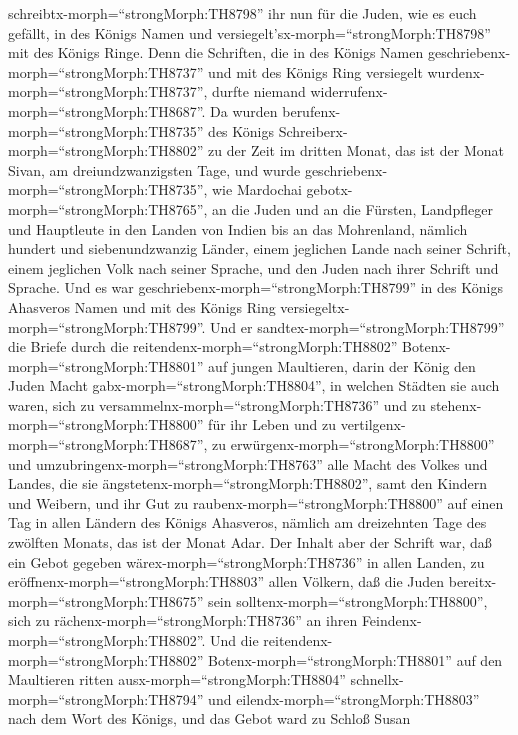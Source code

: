 schreibtx-morph=``strongMorph:TH8798'' ihr nun für die Juden, wie es
euch gefällt, in des Königs Namen und
versiegelt'sx-morph=``strongMorph:TH8798'' mit des Königs Ringe. Denn
die Schriften, die in des Königs Namen
geschriebenx-morph=``strongMorph:TH8737'' und mit des Königs Ring
versiegelt wurdenx-morph=``strongMorph:TH8737'', durfte niemand
widerrufenx-morph=``strongMorph:TH8687''.  Da wurden
berufenx-morph=``strongMorph:TH8735'' des Königs
Schreiberx-morph=``strongMorph:TH8802'' zu der Zeit im dritten Monat,
das ist der Monat Sivan, am dreiundzwanzigsten Tage, und wurde
geschriebenx-morph=``strongMorph:TH8735'', wie Mardochai
gebotx-morph=``strongMorph:TH8765'', an die Juden und an die Fürsten,
Landpfleger und Hauptleute in den Landen von Indien bis an das
Mohrenland, nämlich hundert und siebenundzwanzig Länder, einem jeglichen
Lande nach seiner Schrift, einem jeglichen Volk nach seiner Sprache, und
den Juden nach ihrer Schrift und Sprache.  Und es war
geschriebenx-morph=``strongMorph:TH8799'' in des Königs Ahasveros Namen
und mit des Königs Ring versiegeltx-morph=``strongMorph:TH8799''. Und er
sandtex-morph=``strongMorph:TH8799'' die Briefe durch die
reitendenx-morph=``strongMorph:TH8802''
Botenx-morph=``strongMorph:TH8801'' auf jungen Maultieren, 
darin der König den Juden Macht gabx-morph=``strongMorph:TH8804'', in
welchen Städten sie auch waren, sich zu
versammelnx-morph=``strongMorph:TH8736'' und zu
stehenx-morph=``strongMorph:TH8800'' für ihr Leben und zu
vertilgenx-morph=``strongMorph:TH8687'', zu
erwürgenx-morph=``strongMorph:TH8800'' und
umzubringenx-morph=``strongMorph:TH8763'' alle Macht des Volkes und
Landes, die sie ängstetenx-morph=``strongMorph:TH8802'', samt den
Kindern und Weibern, und ihr Gut zu raubenx-morph=``strongMorph:TH8800''
 auf einen Tag in allen Ländern des Königs Ahasveros,
nämlich am dreizehnten Tage des zwölften Monats, das ist der Monat Adar.
 Der Inhalt aber der Schrift war, daß ein Gebot gegeben
wärex-morph=``strongMorph:TH8736'' in allen Landen, zu
eröffnenx-morph=``strongMorph:TH8803'' allen Völkern, daß die Juden
bereitx-morph=``strongMorph:TH8675'' sein
solltenx-morph=``strongMorph:TH8800'', sich zu
rächenx-morph=``strongMorph:TH8736'' an ihren
Feindenx-morph=``strongMorph:TH8802''.  Und die
reitendenx-morph=``strongMorph:TH8802''
Botenx-morph=``strongMorph:TH8801'' auf den Maultieren ritten
ausx-morph=``strongMorph:TH8804'' schnellx-morph=``strongMorph:TH8794''
und eilendx-morph=``strongMorph:TH8803'' nach dem Wort des Königs, und
das Gebot ward zu Schloß Susan
